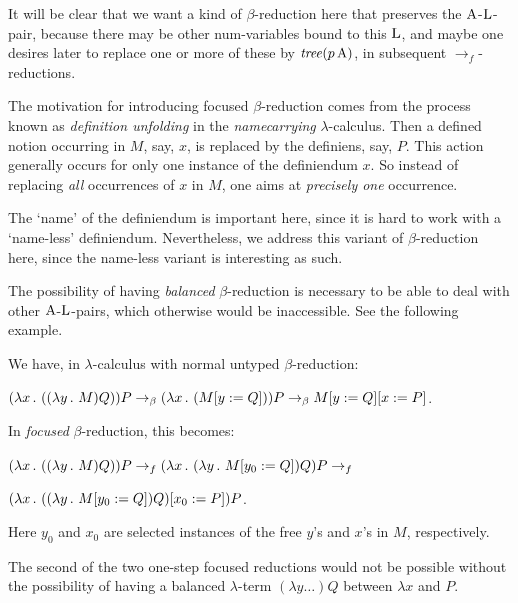 \documentclass[submission,copyright,creativecommons]{eptcs}
\begin{document}
It will be clear that we want a kind of $\beta$-reduction here that preserves the ${\rm A}$-${\rm L}$-pair, because there may be other num-variables bound to this ${\rm L}$, and maybe one desires later to replace one or more of these by ${\it tree}(p \, {\rm A})$, in subsequent $\rightarrow_f$-reductions.



\smallskip

The motivation for introducing focused $\beta$-reduction comes from the process known as {\em definition unfolding\/} in the {\it namecarrying\/} $\lambda$-calculus. Then a defined notion occurring in $M$, say, $x$, is replaced by the definiens, say, $P$. This action generally occurs for only one instance of the definiendum $x$. So instead of replacing {\em all\/} occurrences of $x$ in $M$, one aims at {\em precisely one\/} occurrence.

The `name' of the definiendum is important here, since it is hard to work with a `name-less' definiendum. Nevertheless, we address this variant of $\beta$-reduction here, since the name-less variant is interesting as such.

The possibility of having {\em balanced\/} $\beta$-reduction is necessary to be able to deal with other ${\rm A}$-${\rm L}$-pairs, which otherwise would be inaccessible. See the following example.

\begin{Exa}\label{SubSecFocExa}
We have, in $\lambda$-calculus with normal untyped $\beta$-reduction:

$(\lambda x  \, . \,\, ((\lambda y  \, . \,\, M) Q)) P \rightarrow_{\beta} (\lambda x  \, . \,\, (M[y := Q])) P \rightarrow_{\beta} M[y := Q][x := P]$.

\noindent In {\em focused\/} $\beta$-reduction, this becomes:

$(\lambda x \, . \,\, ((\lambda y  \, . \,\, M) Q)) P \rightarrow_f (\lambda x  \, . \,\, (\lambda y  \, . \,\, M[y_0 := Q])Q) P \rightarrow_f$

\mbox{$(\lambda x  \, . \,\, ((\lambda y  \, . \,\, M[y_0 := Q])Q)[x_0 := P])P$}.


\noindent Here $y_0$ and $x_0$ are selected instances of the free $y$'s and $x$'s in $M$, respectively.

The second of the two one-step focused reductions would not be possible without the possibility of having a balanced $\lambda$-term $(\lambda y \ldots)Q$ between $\lambda x$ and $P$.

\end{Exa}
\end{document}
